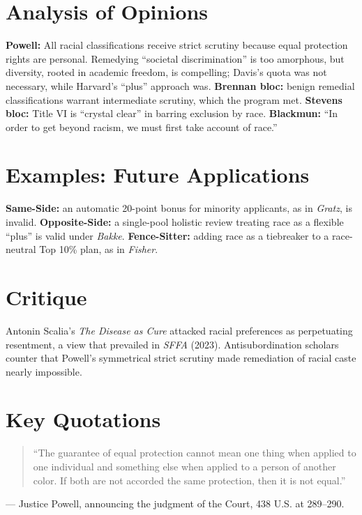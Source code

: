 \documentclass[12pt]{article}
\begin{document}
\section{Analysis of Opinions}
\textbf{Powell:} All racial classifications receive strict scrutiny because equal protection rights are personal. Remedying ``societal discrimination'' is too amorphous, but diversity, rooted in academic freedom, is compelling; Davis's quota was not necessary, while Harvard's ``plus'' approach was. \textbf{Brennan bloc:} benign remedial classifications warrant intermediate scrutiny, which the program met. \textbf{Stevens bloc:} Title VI is ``crystal clear'' in barring exclusion by race. \textbf{Blackmun:} ``In order to get beyond racism, we must first take account of race.''

\section{Examples: Future Applications}
\textbf{Same-Side:} an automatic 20-point bonus for minority applicants, as in \textit{Gratz}, is invalid. \textbf{Opposite-Side:} a single-pool holistic review treating race as a flexible ``plus'' is valid under \textit{Bakke}. \textbf{Fence-Sitter:} adding race as a tiebreaker to a race-neutral Top 10\% plan, as in \textit{Fisher}.

\section{Critique}
Antonin Scalia's \textit{The Disease as Cure} attacked racial preferences as perpetuating resentment, a view that prevailed in \textit{SFFA} (2023). Antisubordination scholars counter that Powell's symmetrical strict scrutiny made remediation of racial caste nearly impossible.

\section{Key Quotations}
\begin{quote}
``The guarantee of equal protection cannot mean one thing when applied to one individual and something else when applied to a person of another color. If both are not accorded the same protection, then it is not equal.''
\end{quote}
\noindent --- Justice Powell, announcing the judgment of the Court, 438 U.S. at 289--290.
\end{document}
